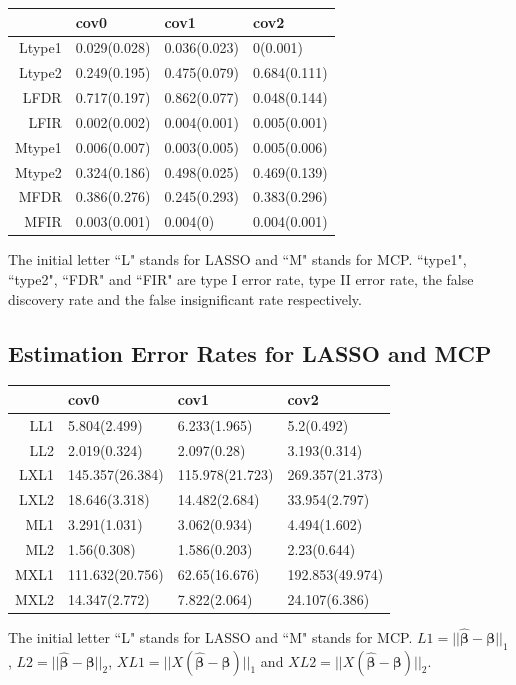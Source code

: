\documentclass{beamer}
\newcommand{\bm}[1]{{\boldsymbol {#1}}}
\def\frameend{} %
\begin{document}
\begin{table}[ht]
\centering
\begin{tabular}{rlll}
  \hline
 & cov0 & cov1 & cov2 \\ 
  \hline
Ltype1 & 0.029(0.028) & 0.036(0.023) & 0(0.001) \\ 
  Ltype2 & 0.249(0.195) & 0.475(0.079) & 0.684(0.111) \\ 
  LFDR & 0.717(0.197) & 0.862(0.077) & 0.048(0.144) \\ 
  LFIR & 0.002(0.002) & 0.004(0.001) & 0.005(0.001) \\ 
  Mtype1 & 0.006(0.007) & 0.003(0.005) & 0.005(0.006) \\ 
  Mtype2 & 0.324(0.186) & 0.498(0.025) & 0.469(0.139) \\ 
  MFDR & 0.386(0.276) & 0.245(0.293) & 0.383(0.296) \\ 
  MFIR & 0.003(0.001) & 0.004(0) & 0.004(0.001) \\ 
   \hline
\end{tabular}
\end{table}
The initial letter ``L" stands for LASSO and ``M" stands for MCP. ``type1", ``type2", ``FDR" and ``FIR" are type I error rate, type II error rate, the false discovery rate and the false insignificant rate respectively.
\frameend{}

\subsection{Estimation Error Rates for LASSO and MCP}
\begin{table}[ht]
\centering
\begin{tabular}{rlll}
  \hline
 & cov0 & cov1 & cov2 \\ 
  \hline
LL1 & 5.804(2.499) & 6.233(1.965) & 5.2(0.492) \\ 
  LL2 & 2.019(0.324) & 2.097(0.28) & 3.193(0.314) \\ 
  LXL1 & 145.357(26.384) & 115.978(21.723) & 269.357(21.373) \\ 
  LXL2 & 18.646(3.318) & 14.482(2.684) & 33.954(2.797) \\ 
  ML1 & 3.291(1.031) & 3.062(0.934) & 4.494(1.602) \\ 
  ML2 & 1.56(0.308) & 1.586(0.203) & 2.23(0.644) \\ 
  MXL1 & 111.632(20.756) & 62.65(16.676) & 192.853(49.974) \\ 
  MXL2 & 14.347(2.772) & 7.822(2.064) & 24.107(6.386) \\ 
   \hline
\end{tabular}
\end{table}
The initial letter ``L" stands for LASSO and ``M" stands for MCP. $L1=||\hat{\bm\beta}-\bm\beta||_1$, $L2=||\hat{\bm\beta}-\bm\beta||_2$, $XL1=||X(\hat{\bm\beta}-\bm\beta)||_1$ and $XL2=||X(\hat{\bm\beta}-\bm\beta)||_2$.
\frameend{}
\end{document}
